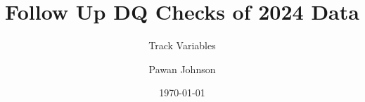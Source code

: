 \documentclass{beamer}
\title{Follow Up DQ Checks of 2024 Data}
\subtitle{Track Variables}
\author{Pawan Johnson}
\institute{University of Liverpool}
\date{\today}
\begin{document}
\begingroup
{}
\begin{frame}
    \maketitle
\end{frame}
\endgroup









\appendix
\appendsubframes
\end{document}
